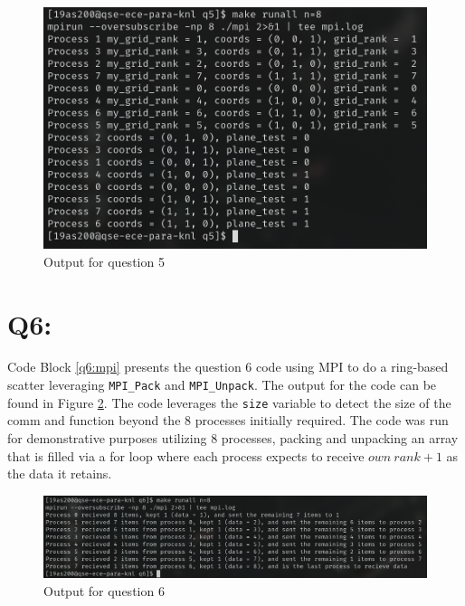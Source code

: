 \documentclass[11pt]{article}
\begin{document}
\begin{figure}[H]
\centering
    \includegraphics[width=\textwidth]{./images/q5.png}
\caption{Output for question 5}
\label{fig:q5}
\end{figure}

\newpage

\section*{Q6:}

Code Block \ref{q6:mpi} presents the question 6 code using MPI to do a ring-based scatter leveraging \texttt{MPI\_Pack} and \texttt{MPI\_Unpack}.
The output for the code can be found in Figure \ref{fig:q6}.
The code leverages the \texttt{size} variable to detect the size of the comm and function beyond the 8 processes initially required.
The code was run for demonstrative purposes utilizing 8 processes, packing and unpacking an array that is filled via a for loop where each process expects to receive $own\ rank + 1$ as the data it retains.



\begin{figure}[H]
\centering
    \includegraphics[width=\textwidth]{./images/q6.png}
\caption{Output for question 6}
\label{fig:q6}
\end{figure}
\end{document}
